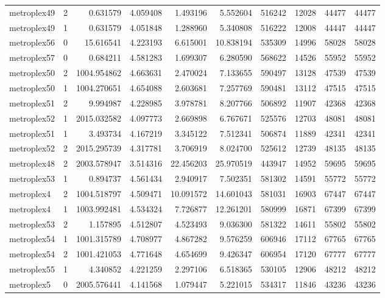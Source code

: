 \documentclass[../../../thesis.tex]{subfiles}
\begin{document}
\begin{longtable}{|l|r|r|r|r|r|r|r|r|r|}
metroplex49 & 2 & 0.631579 & 4.059408 & 1.493196 & 5.552604 & 516242 & 12028 & 44477 & 44477 \\
metroplex49 & 1 & 0.631579 & 4.051848 & 1.288960 & 5.340808 & 516222 & 12008 & 44447 & 44447 \\
metroplex56 & 0 & 15.616541 & 4.223193 & 6.615001 & 10.838194 & 535309 & 14996 & 58028 & 58028 \\
metroplex57 & 0 & 0.684211 & 4.581283 & 1.699307 & 6.280590 & 568622 & 14526 & 55952 & 55952 \\
metroplex50 & 2 & 1004.954862 & 4.663631 & 2.470024 & 7.133655 & 590497 & 13128 & 47539 & 47539 \\
metroplex50 & 1 & 1004.270651 & 4.654088 & 2.603681 & 7.257769 & 590481 & 13112 & 47515 & 47515 \\
metroplex51 & 2 & 9.994987 & 4.228985 & 3.978781 & 8.207766 & 506892 & 11907 & 42368 & 42368 \\
metroplex52 & 1 & 2015.032582 & 4.097773 & 2.669898 & 6.767671 & 525576 & 12703 & 48081 & 48081 \\
metroplex51 & 1 & 3.493734 & 4.167219 & 3.345122 & 7.512341 & 506874 & 11889 & 42341 & 42341 \\
metroplex52 & 2 & 2015.295739 & 4.317781 & 3.706919 & 8.024700 & 525612 & 12739 & 48135 & 48135 \\
metroplex48 & 2 & 2003.578947 & 3.514316 & 22.456203 & 25.970519 & 443947 & 14952 & 59695 & 59695 \\
metroplex53 & 1 & 0.894737 & 4.561434 & 2.940917 & 7.502351 & 581302 & 14591 & 55772 & 55772 \\
metroplex4 & 2 & 1004.518797 & 4.509471 & 10.091572 & 14.601043 & 581031 & 16903 & 67447 & 67447 \\
metroplex4 & 1 & 1003.992481 & 4.534324 & 7.726877 & 12.261201 & 580999 & 16871 & 67399 & 67399 \\
metroplex53 & 2 & 1.157895 & 4.512807 & 4.523493 & 9.036300 & 581322 & 14611 & 55802 & 55802 \\
metroplex54 & 1 & 1001.315789 & 4.708977 & 4.867282 & 9.576259 & 606946 & 17112 & 67765 & 67765 \\
metroplex54 & 2 & 1001.421053 & 4.771648 & 4.654699 & 9.426347 & 606954 & 17120 & 67777 & 67777 \\
metroplex55 & 1 & 4.340852 & 4.221259 & 2.297106 & 6.518365 & 530105 & 12906 & 48212 & 48212 \\
metroplex5 & 0 & 2005.576441 & 4.141568 & 1.079447 & 5.221015 & 534317 & 11846 & 43236 & 43236 \\

\end{longtable}
\end{document}
